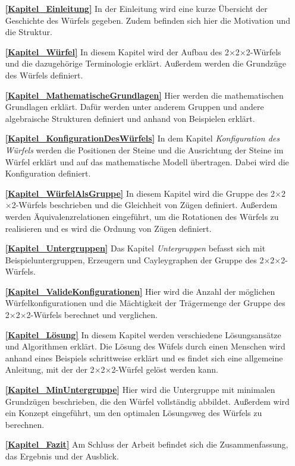 \documentclass[12pt,a4paper, usenames, dvipsnames]{article}
\theoremstyle{mystyle}
\theoremstyle{definition}
\newcommand{\Ttwo}{2$\times$2$\times$2-}
\begin{document}
\begin{itemize}
\item[\textbf{\ref{Kapitel_Einleitung}}] In der Einleitung wird eine kurze Übersicht der Geschichte des Würfels gegeben. Zudem befinden sich hier die Motivation und die Struktur.

\item[\textbf{\ref{Kapitel_Würfel}}] In diesem Kapitel wird der Aufbau des \Ttwo Würfels und die dazugehörige Terminologie erklärt. Außerdem werden die Grundzüge des Würfels definiert.

\item[\textbf{\ref{Kapitel_MathematischeGrundlagen}}] Hier werden die mathematischen Grundlagen erklärt. Dafür werden unter anderem Gruppen und andere algebraische Strukturen definiert und anhand von Beispielen erklärt.

\item[\textbf{\ref{Kapitel_KonfigurationDesWürfels}}] In dem Kapitel \textit{Konfiguration des Würfels} werden die Positionen der Steine und die Ausrichtung der Steine im Würfel erklärt und auf das mathematische Modell übertragen. Dabei wird die Konfiguration definiert. 

\item[\textbf{\ref{Kapitel_WürfelAlsGruppe}}] In diesem Kapitel wird die Gruppe des \Ttwo Würfels beschrieben und die Gleichheit von Zügen definiert. Außerdem werden Äquivalenzrelationen eingeführt, um die Rotationen des Würfels zu realisieren und es wird die Ordnung von Zügen definiert.

\item[\textbf{\ref{Kapitel_Untergruppen}}] Das Kapitel \textit{Untergruppen} befasst sich mit Beispieluntergruppen, Erzeugern und Cayleygraphen der Gruppe des \Ttwo Würfels.

\item[\textbf{\ref{Kapitel_ValideKonfigurationen}}] Hier wird die Anzahl der möglichen Würfelkonfigurationen und die Mächtigkeit der Trägermenge der Gruppe des \Ttwo Würfels berechnet und verglichen.

\item[\textbf{\ref{Kapitel_Lösung}}] In diesem Kapitel werden verschiedene Lösungsansätze und Algorithmen erklärt. Die Lösung des Wüfels durch einen Menschen wird anhand eines Beispiels schrittweise erklärt und es findet sich eine allgemeine Anleitung, mit der der \Ttwo Würfel gelöst werden kann.

\item[\textbf{\ref{Kapitel_MinUntergruppe}}] Hier wird die Untergruppe mit minimalen Grundzügen beschrieben, die den Würfel vollständig abbildet. Außerdem wird ein Konzept eingeführt, um den optimalen Lösungsweg des Würfels zu berechnen.  

\item[\textbf{\ref{Kapitel_Fazit}}] Am Schluss der Arbeit befindet sich die Zusammenfassung, das Ergebnis und der Ausblick.

\end{itemize}
\end{document}
